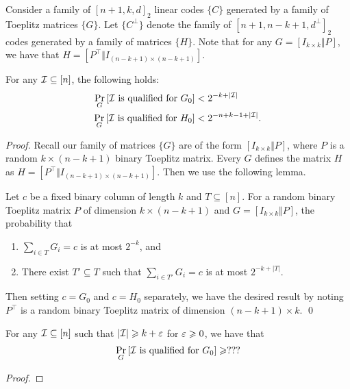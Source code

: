 Consider a family of $[n+1,k,d]_2$ linear codes $\{C\}$ generated by a family of Toeplitz matrices $\{G\}$.
Let $\{C^\perp\}$ denote the family of $[n+1, n-k+1,d^\perp]_2$ codes generated by a family of matrices $\{H\}$.
Note that for any $G = [I_{k\times k} \Vert P]$, we have that $H = [P^\top\Vert I_{(n-k+1)\times (n-k+1)}]$.

\begin{lemma}\label{lem:qual}
	For any ${\mathcal I} \subseteq [n]$, the following holds:
	\begin{align*}
		\Pr_G\left[{\mathcal I} \text{ is qualified for } G_0\right] &< 2^{-k+|{\mathcal I}|}\\
		\Pr_G\left[{\mathcal I} \text{ is qualified for } H_0\right] &< 2^{-n+k-1+|{\mathcal I}|}.
	\end{align*}
\end{lemma}
\begin{proof}
	Recall our family of matrices $\{G\}$ are of the form $[I_{k\times k}\Vert P]$, where $P$ is a random $k\times (n-k+1)$ binary Toeplitz matrix.
	Every $G$ defines the matrix $H$ as $H = [P^\top\Vert I_{(n-k+1)\times (n-k+1)}]$.
	Then we use the following lemma.
	\begin{importedlemma}\label{implem:toeplitz}
		Let $c$ be a fixed binary column of length $k$ and $T \subseteq [n]$.
		For a random binary Toeplitz matrix $P$ of dimension $k \times (n-k+1)$ and $G = [I_{k \times k}\Vert P]$, the probability that
		\begin{enumerate}
			\item $\sum_{i \in T} G_i = c$ is at most $2^{-k}$, and
			\item There exist $T' \subseteq T$ such that $\sum_{i \in T'} G_i = c$ is at most $2^{-k+|T|}$.
		\end{enumerate}
	\end{importedlemma}
	Then setting $c = G_0$ and $c= H_0$ separately, we have the desired result by noting $P^\top$ is a random binary Toeplitz matrix of dimension $(n-k+1) \times k$. \qed
\end{proof}

\begin{lemma}\label{lem:full-rank}
	For any ${\mathcal I} \subseteq [n]$ such that $|{\mathcal I}| \geqslant k + \varepsilon$ for $\varepsilon \geqslant 0$, we have that
	\begin{align*}
		\Pr_G\left[ {\mathcal I} \text{ is qualified for } G_0 \right] \geqslant ???
	\end{align*}
\end{lemma}
\begin{proof}

\end{proof}


